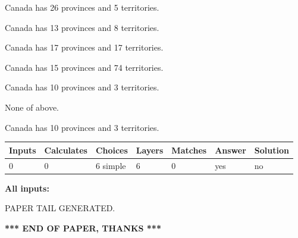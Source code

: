 \documentclass[12pt]{article}
\begin{document}
 
Canada has  26 provinces and  5 territories.
 
 
Canada has  13 provinces and  8 territories.
 
 
Canada has  17 provinces and  17 territories.
 
 
Canada has  15 provinces and  74 territories.
 
 
Canada has 10  provinces and 3 territories.
 
 
 None of above.
 
 
\noindent{}
 
 
Canada has 10  provinces and 3 territories.
 
 
\noindent{}
 
 
   
   
   
   
\noindent\begin{tabular}{|l|l|l|l|l|l|l|}
 \hline
Inputs & Calculates & Choices & Layers & Matches & Answer & Solution \\ \hline
 0  & 
 0  & 
 6
  simple  
  & 
 6  & 
 0  & 
  yes & 
  no 
  \\ \hline
 \end{tabular}
   
   
   
   
\noindent{}
   
   
   
   
\noindent\vspace{0.1in}\hspace{-0.08in} {\textbf{\Large{All inputs: }}}
   
   
   
   
   
   
 \vspace{0.2in}
 
   
   
\vspace{2.0in} PAPER TAIL GENERATED.
   
   
   
   
\vspace{1.0in} 
{\textbf{\large{ *** END OF PAPER, THANKS *** }}} 
   
\end{document}
